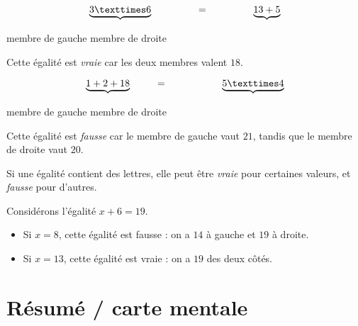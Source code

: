 \documentclass[../€Cours-complet/Cours-complet]{subfiles}
\begin{document}
\begin{exemple}
	$$ \underbrace{3 × 6} \hspace{4.5em} = \hspace{4.5em} \underbrace{13 + 5} $$
	\begin{center}
		membre de gauche \hspace{3em} membre de droite
	\end{center}

	Cette égalité est \textit{vraie} car les deux membres valent $18$. \vspace{1em}

	$$ \underbrace{1 + 2 + 18} \hspace{2.5em} = \hspace{5.5em} \underbrace{5 × 4} $$
	\begin{center}
		membre de gauche \hspace{3em} membre de droite
	\end{center}

	Cette égalité est \textit{fausse} car le membre de gauche vaut $21$, tandis que le membre de droite vaut $20$.
\end{exemple}

\begin{cours}
	Si une égalité contient des lettres, elle peut être \textit{vraie} pour certaines valeurs, et \textit{fausse} pour d'autres.
\end{cours}

\begin{exemple}
	Considérons l'égalité $x + 6 = 19$.
	\begin{itemize}
		\item Si $x = 8$, cette égalité est fausse : on a $14$ à gauche et $19$ à droite.
		\item Si $x = 13$, cette égalité est vraie : on a $19$ des deux côtés.
	\end{itemize}
\end{exemple}

\section*{Résumé / carte mentale}


\end{document}
